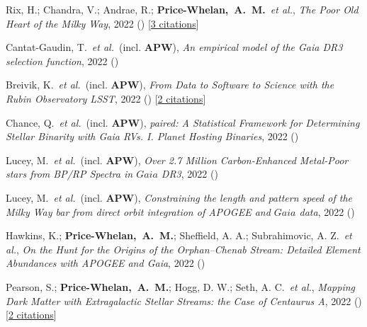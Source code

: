 \item[{\color{deemph}\scriptsize19}]Rix, H.; Chandra, V.; Andrae, R.; \textbf{Price-Whelan,~A.~M.}~\textit{et al.}, \textit{The Poor Old Heart of the Milky Way}, 2022 () [\href{http://adsabs.harvard.edu/abs/2022arXiv220902722R}{3 citations}]

\item[{\color{deemph}\scriptsize18}]Cantat-Gaudin, T.~\textit{et al.}~(incl. \textbf{APW}), \textit{An empirical model of the Gaia DR3 selection function}, 2022 ()

\item[{\color{deemph}\scriptsize17}]Breivik, K.~\textit{et al.}~(incl. \textbf{APW}), \textit{From Data to Software to Science with the Rubin Observatory LSST}, 2022 () [\href{http://adsabs.harvard.edu/abs/2022arXiv220802781B}{2 citations}]

\item[{\color{deemph}\scriptsize16}]Chance, Q.~\textit{et al.}~(incl. \textbf{APW}), \textit{paired: A Statistical Framework for Determining Stellar Binarity with Gaia RVs. I. Planet Hosting Binaries}, 2022 ()

\item[{\color{deemph}\scriptsize15}]Lucey, M.~\textit{et al.}~(incl. \textbf{APW}), \textit{Over 2.7 Million Carbon-Enhanced Metal-Poor stars from BP/RP Spectra in $Gaia$ DR3}, 2022 ()

\item[{\color{deemph}\scriptsize14}]Lucey, M.~\textit{et al.}~(incl. \textbf{APW}), \textit{Constraining the length and pattern speed of the Milky Way bar from direct orbit integration of APOGEE and $Gaia$ data}, 2022 ()

\item[{\color{deemph}\scriptsize13}]Hawkins, K.; \textbf{Price-Whelan,~A.~M.}; Sheffield, A. A.; Subrahimovic, A. Z.~\textit{et al.}, \textit{On the Hunt for the Origins of the Orphan--Chenab Stream: Detailed Element Abundances with APOGEE and Gaia}, 2022 ()

\item[{\color{deemph}\scriptsize12}]Pearson, S.; \textbf{Price-Whelan,~A.~M.}; Hogg, D. W.; Seth, A. C.~\textit{et al.}, \textit{Mapping Dark Matter with Extragalactic Stellar Streams: the Case of Centaurus A}, 2022 () [\href{http://adsabs.harvard.edu/abs/2022arXiv220512277P}{2 citations}]

